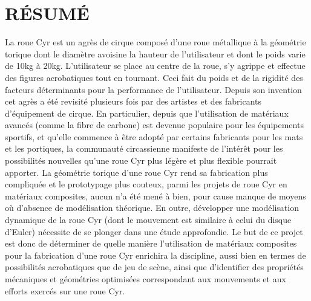 %
\chapter*{RÉSUMÉ}\thispagestyle{headings}

La roue Cyr est un agrès de cirque composé d’une roue métallique à la géométrie torique dont le diamètre avoisine la hauteur de l’utilisateur et dont le poids varie de 10kg à 20kg. L’utilisateur se place au centre de la roue, s’y agrippe et effectue des figures acrobatiques tout en tournant. Ceci fait du poids et de la rigidité des facteurs déterminants pour la performance de l’utilisateur. Depuis son invention cet agrès a été revisité plusieurs fois par des artistes et des fabricants d’équipement de cirque. En particulier, depuis que l’utilisation de matériaux avancés (comme la fibre de carbone) est devenue populaire pour les équipements sportifs, et qu’elle commence à être adopté par certains fabricants pour les mats et les portiques, la communauté circassienne manifeste de l'intérêt pour les possibilités nouvelles qu’une roue Cyr plus légère et plus flexible pourrait apporter. La géométrie torique d’une roue Cyr rend sa fabrication plus compliquée et le prototypage plus couteux, parmi les projets de roue Cyr en matériaux composites, aucun n’a été mené à bien, pour cause manque de moyens où d’absence de modélisation théorique. En outre, développer une modélisation dynamique de la roue Cyr (dont le mouvement est similaire à celui du disque d’Euler) nécessite de se plonger dans une étude approfondie.
Le but de ce projet est donc de déterminer de quelle manière l’utilisation de matériaux composites pour la fabrication d’une roue Cyr enrichira la discipline, aussi bien en termes de possibilités acrobatiques que de jeu de scène, ainsi que d’identifier des propriétés mécaniques et géométries optimisées correspondant aux mouvements et aux efforts exercés sur une roue Cyr.



